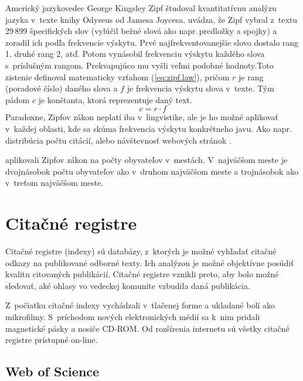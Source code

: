 Americký jazykovedec George Kingsley Zipf študoval kvantitatívnu analýzu jazyka
v~texte knihy Odyseus od Jamesa Joycesa. \citet{Powers1998} uvádza, že Zipf
vybral z~textu 29\,899 špecifických slov (vylúčil bežné slová ako
napr.\,predložky a spojky) a zoradil ich podľa frekvencie výskytu.  Prvé
najfrekventovanejšie slovo dostalo rang 1, druhé rang 2, atď.  Potom vynásobil
frekvenciu výskytu každého slova s~príslušným rangom.  Prekvapujúco mu vyšli
veľmi podobné hodnoty.Toto zistenie definoval matematicky vzťahom (\ref{eq:zipf.law}),
pričom $r$ je rang (poradové číslo) daného slova a $f$ je frekvencia výskytu
slova v~texte.  Tým pádom $c$ je konštanta, ktorá reprezentuje daný text.
\begin{equation}
\label{eq:zipf.law}
c = r \cdot f
\end{equation}
Paradoxne, Zipfov zákon neplatí iba v~lingvistike, ale je ho možné aplikovať
v~každej oblasti, kde sa skúma frekvencia výskytu konkrétneho javu.  Ako
napr.\,distribúcia počtu citácií, alebo návštevnosť webových stránok \citep{Li2002}.

\citet{Jiang2014} aplikovali Zipfov zákon na počty obyvateľov v~mestách.  V~najväčšom
meste je dvojnásobok počtu obyvateľov ako v~druhom najväčšom meste a trojnásobok
ako v~treťom najväčšom meste.



\section{Citačné registre}

Citačné registre (indexy) sú databázy, z~ktorých je možné vyhľadať citačné
odkazy na publikované odborné texty.  Ich analýzou je možné objektívne posúdiť
kvalitu citovaných publikácií.  Citačné registre vznikli preto, aby bolo možné
sledovať, aké ohlasy vo vedeckej komunite vzbudila daná publikácia.

Z~počiatku citačné indexy vychádzali v~tlačenej forme a ukladané boli ako
mikrofilmy.  S~príchodom nových elektronických médií sa k~nim pridali magnetické
pásky a nosiče CD-ROM.  Od rozšírenia internetu sú všetky citačné registre
prístupné on-line.


\subsection{Web of Science}
\label{sec:wos}

